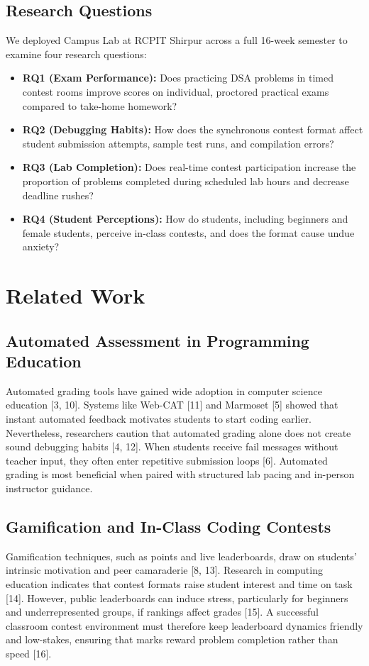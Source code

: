 \documentclass[12pt,a4paper]{article}
\begin{document}
\subsection{Research Questions}
We deployed Campus Lab at RCPIT Shirpur across a full 16-week semester to examine four research questions:
\begin{itemize}[leftmargin=1.5em, itemsep=1pt]
    \item \textbf{RQ1 (Exam Performance):} Does practicing DSA problems in timed contest rooms improve scores on individual, proctored practical exams compared to take-home homework?
    \item \textbf{RQ2 (Debugging Habits):} How does the synchronous contest format affect student submission attempts, sample test runs, and compilation errors?
    \item \textbf{RQ3 (Lab Completion):} Does real-time contest participation increase the proportion of problems completed during scheduled lab hours and decrease deadline rushes?
    \item \textbf{RQ4 (Student Perceptions):} How do students, including beginners and female students, perceive in-class contests, and does the format cause undue anxiety?
\end{itemize}

\section{Related Work}
\label{sec:related}

\subsection{Automated Assessment in Programming Education}
Automated grading tools have gained wide adoption in computer science education [3, 10]. Systems like Web-CAT [11] and Marmoset [5] showed that instant automated feedback motivates students to start coding earlier. Nevertheless, researchers caution that automated grading alone does not create sound debugging habits [4, 12]. When students receive fail messages without teacher input, they often enter repetitive submission loops [6]. Automated grading is most beneficial when paired with structured lab pacing and in-person instructor guidance.

\subsection{Gamification and In-Class Coding Contests}
Gamification techniques, such as points and live leaderboards, draw on students' intrinsic motivation and peer camaraderie [8, 13]. Research in computing education indicates that contest formats raise student interest and time on task [14]. However, public leaderboards can induce stress, particularly for beginners and underrepresented groups, if rankings affect grades [15]. A successful classroom contest environment must therefore keep leaderboard dynamics friendly and low-stakes, ensuring that marks reward problem completion rather than speed [16].
\end{document}
